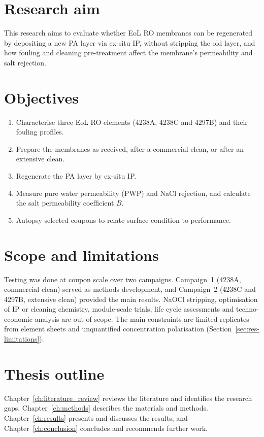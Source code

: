 \section{Research aim}
\label{sec:aim}
This research aims to evaluate whether EoL RO membranes can be regenerated by depositing a new PA layer via ex-situ IP, without stripping the old layer, and how fouling and cleaning pre-treatment affect the membrane's permeability and salt rejection.

\section{Objectives}
\label{sec:objectives}
\begin{enumerate}[nosep]
  \item Characterise three EoL RO elements (4238A, 4238C and 4297B) and their fouling profiles.
  \item Prepare the membranes as received, after a commercial clean, or after an extensive clean.
  \item Regenerate the PA layer by ex-situ IP.
  \item Measure pure water permeability (PWP) and NaCl rejection, and calculate the salt permeability coefficient $B$.
  \item Autopsy selected coupons to relate surface condition to performance.
\end{enumerate}



\section{Scope and limitations}
\label{sec:scope}
Testing was done at coupon scale over two campaigns. Campaign~1 (4238A, commercial clean) served as methods development, and Campaign~2 (4238C and 4297B, extensive clean) provided the main results. NaOCl stripping, optimisation of IP or cleaning chemistry, module-scale trials, life cycle assessments and techno-economic analysis are out of scope. The main constraints are limited replicates from element sheets and unquantified concentration polarisation (Section~\ref{sec:res-limitations}).



\section{Thesis outline}
\label{sec:outline}
Chapter~\ref{ch:literature_review} reviews the literature and identifies the research gaps. Chapter~\ref{ch:methods} describes the materials and methods. Chapter~\ref{ch:results} presents and discusses the results, and Chapter~\ref{ch:conclusion} concludes and recommends further work.